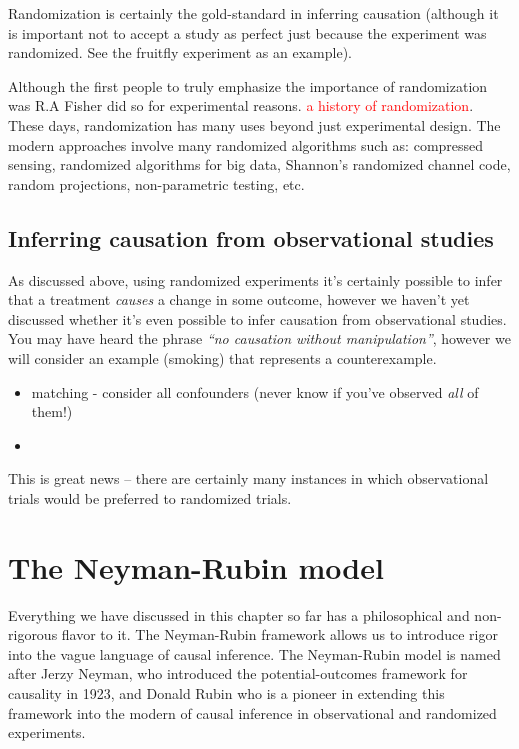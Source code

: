 Randomization is certainly the gold-standard in inferring causation (although it is important not to accept a study as perfect just because the experiment was randomized. See the fruitfly experiment as an example).

Although the first people to truly emphasize the importance of randomization was R.A Fisher did so for experimental reasons. \textcolor{red}{a history of randomization}. These days, randomization has many uses beyond just experimental design. The modern approaches involve many randomized algorithms such as: compressed sensing, randomized algorithms for big data, Shannon's randomized channel code, random projections, non-parametric testing, etc.


\subsection*{Inferring causation from observational studies}

As discussed above, using randomized experiments it's certainly possible to infer that a treatment \emph{causes} a change in some outcome, however we haven't yet discussed whether it's even possible to infer causation from observational studies. You may have heard the phrase \emph{``no causation without manipulation''}, however we will consider an example (smoking) that represents a counterexample.


\begin{itemize}
\item matching - consider all confounders (never know if you've observed \emph{all} of them!)
\item
\end{itemize}



This is great news -- there are certainly many instances in which observational trials would be preferred to randomized trials.

\section{The Neyman-Rubin model}

Everything we have discussed in this chapter so far has a philosophical and non-rigorous flavor to it. The Neyman-Rubin framework allows us to introduce rigor into the vague language of causal inference. The Neyman-Rubin model is named after Jerzy Neyman, who introduced the potential-outcomes framework for causality in 1923, and Donald Rubin who is a pioneer in extending this framework into the modern of causal inference in observational and randomized experiments.

